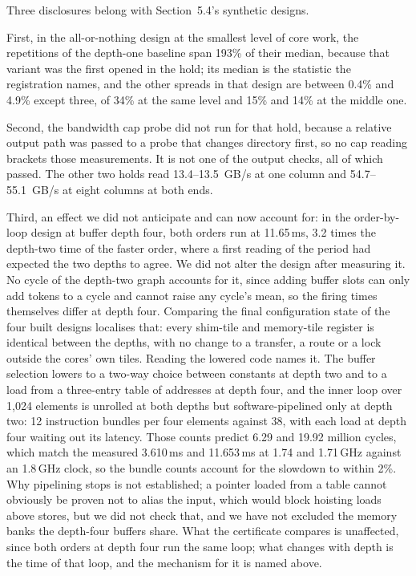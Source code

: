 \documentclass{article}
\newcommand{\ms}{\,ms}
\begin{document}
Three disclosures belong with Section~5.4's synthetic designs.

First, in the all-or-nothing design at the smallest level of core work, the repetitions of the depth-one baseline span
193\% of their median, because that variant was the first opened in the hold; its median is the statistic the
registration names, and the other spreads in that design are between 0.4\% and 4.9\% except three, of 34\% at the same level and 15\% and 14\% at the middle one.

Second, the bandwidth cap probe did not run for that hold, because a relative output path was passed to a probe that
changes directory first, so no cap reading brackets those measurements. It is not one of the output checks, all of
which passed. The other two holds read 13.4--13.5~GB/s at one column and 54.7--55.1~GB/s at eight columns at both ends.

Third, an effect we did not anticipate and can now account for: in the order-by-loop
design at buffer depth four, both orders run at 11.65\ms, 3.2 times the depth-two time of the faster order, where a first
reading of the period had expected the two depths to agree. We did not alter the design after measuring it. No cycle of the depth-two graph accounts for it, since adding buffer slots can only add tokens to a cycle
and cannot raise any cycle's mean, so the firing times themselves differ at depth four. Comparing the final
configuration state of the four built designs localises that: every shim-tile and memory-tile register is identical
between the depths, with no change to a transfer, a route or a lock outside the cores' own tiles. Reading the lowered
code names it. The buffer selection lowers to a two-way choice between constants at depth two and to a load from a
three-entry table of addresses at depth four, and the inner loop over 1{,}024 elements is unrolled at both depths but
software-pipelined only at depth two: 12 instruction bundles per four elements against 38, with each load at depth four
waiting out its latency. Those counts predict 6.29 and 19.92 million cycles, which match the measured 3.610\ms{} and
11.653\ms{} at 1.74 and 1.71\,GHz against an 1.8\,GHz clock, so the bundle counts account for the slowdown to within
2\%. Why pipelining stops is not established; a pointer loaded from a table cannot obviously be proven not to alias the
input, which would block hoisting loads above stores, but we did not check that, and we have not excluded the memory
banks the depth-four buffers share. What the certificate compares is unaffected, since both orders at depth four run
the same loop; what changes with depth is the time of that loop, and the mechanism for it is named above.
\end{document}
